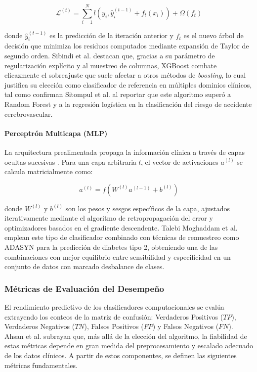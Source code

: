 \documentclass[journal]{IEEEtran}
\begin{document}
\begin{equation}
\mathcal{L}^{(t)} = \sum_{i=1}^{N} l\left(y_i, \hat{y}_i^{(t-1)} + f_t(x_i)\right) + \Omega(f_t)
\end{equation}

donde $\hat{y}_i^{(t-1)}$ es la predicción de la iteración anterior y $f_t$ es el nuevo árbol de decisión que minimiza los residuos computados mediante expansión de Taylor de segundo orden. Sibindi et al. \cite{Sibindi2023} destacan que, gracias a su parámetro de regularización explícito y al muestreo de columnas, XGBoost combate eficazmente el sobreajuste que suele afectar a otros métodos de \textit{boosting}, lo cual justifica su elección como clasificador de referencia en múltiples dominios clínicos, tal como confirman Sitompul et al. \cite{Sitompul2025} al reportar que este algoritmo superó a Random Forest y a la regresión logística en la clasificación del riesgo de accidente cerebrovascular.

\paragraph{Perceptrón Multicapa (MLP)}
La arquitectura prealimentada propaga la información clínica a través de capas ocultas sucesivas \cite{Rumelhart1986}. Para una capa arbitraria $l$, el vector de activaciones $a^{(l)}$ se calcula matricialmente como:

\begin{equation}
a^{(l)} = f\left(W^{(l)} a^{(l-1)} + b^{(l)}\right)
\end{equation}

donde $W^{(l)}$ y $b^{(l)}$ son los pesos y sesgos específicos de la capa, ajustados iterativamente mediante el algoritmo de retropropagación del error y optimizadores basados en el gradiente descendente. Talebi Moghaddam et al. \cite{TalebiMoghaddam2024} emplean este tipo de clasificador combinado con técnicas de remuestreo como ADASYN para la predicción de diabetes tipo 2, obteniendo una de las combinaciones con mejor equilibrio entre sensibilidad y especificidad en un conjunto de datos con marcado desbalance de clases.

\subsubsection{Métricas de Evaluación del Desempeño}

El rendimiento predictivo de los clasificadores computacionales se evalúa extrayendo los conteos de la matriz de confusión: Verdaderos Positivos ($TP$), Verdaderos Negativos ($TN$), Falsos Positivos ($FP$) y Falsos Negativos ($FN$). Ahsan et al. \cite{Ahsan2021} subrayan que, más allá de la elección del algoritmo, la fiabilidad de estas métricas depende en gran medida del preprocesamiento y escalado adecuado de los datos clínicos. A partir de estos componentes, se definen las siguientes métricas fundamentales.
\end{document}
